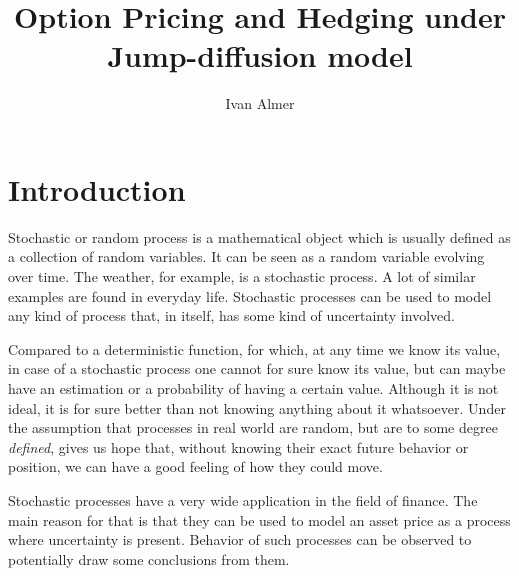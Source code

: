 \documentclass[times, utf8, diplomski]{fer}
\newcommand\blankpage{%
    \null
    \thispagestyle{empty}%
    \addtocounter{page}{-1}%
    \newpage}
\begin{document}
\renewcommand*\contentsname{Table of contents}
\newcommand\indeq{\mathrel{\overset{\makebox[0pt]{\mbox{\normalfont\tiny\sffamily ind.}}}{=}}}
\newtheorem{proposition}{Proposition}
\newtheorem{theorem}{Theorem}
\newtheorem{definition}{Definition}

\renewcommand{\labelitemi}{$\bullet$}


\title{Option Pricing and Hedging under Jump-diffusion model}

\author{Ivan Almer}

\maketitle


\afterpage{\blankpage}

\tableofcontents

\chapter{Introduction}
Stochastic or random process is a mathematical object which is usually defined as a collection of random variables. It can be seen as a random variable evolving over time. The weather, for example, is a stochastic process. A lot of similar examples are found in everyday life. Stochastic processes can be used to model any kind of process that, in itself, has some kind of uncertainty involved. 

Compared to a deterministic function, for which, at any time we know its value, in case of a stochastic process one cannot for sure know its value, but can maybe have an estimation or a probability of having a certain value. Although it is not ideal, it is for sure better than not knowing anything about it whatsoever. Under the assumption that processes in real world are random, but are to some degree \textit{defined}, gives us hope that, without knowing their exact future behavior or position, we can have a good feeling of how they could move.

Stochastic processes have a very wide application in the field of finance. The main reason for that is that they can be used to model an asset price as a process where uncertainty is present. Behavior of such processes can be observed to potentially draw some conclusions from them. 
\end{document}
